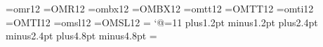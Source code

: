 \font\twelverm=omr12
\font\TWELVERM=OMR12
\font\twelvebx=ombx12
\font\TWELVEBX=OMBX12
\font\twelvett=omtt12
\font\TWELVETT=OMTT12
\font\twelveit=omti12
\font\TWELVEIT=OMTI12
\font\twelvesl=omsl12
\font\TWELVESL=OMSL12
\setbox\strutbox=\hbox{\vrule height10.2pt depth4.2pt width0pt}
{\catcode`@=11 \gdef\raggedbottom{\topskip 12pt plus72pt \r@ggedbottomtrue}}
\topskip=12pt
\normalbaselineskip=14.4pt
\normalbaselines
{} plus1.2pt minus1.2pt
 plus2.4pt minus2.4pt
 plus4.8pt minus4.8pt
\def\makeheadline{\vbox to 0pt{\vskip-27pt
  \line{\vbox to10.2pt{}\the\headline}\vss}
  \nointerlineskip}
\def\makefootline{\baselineskip=28.8pt
  \lineskiplimit=0pt
  \line{\the\footline}}
\footline={\hss\twelverm\folio\hss}
\def\rm{\twelverm}
\def\bf{\twelvebx}
\def\tt{\twelvett}
\def\it{\twelveit}
\def\sl{\twelvesl}
\rm
